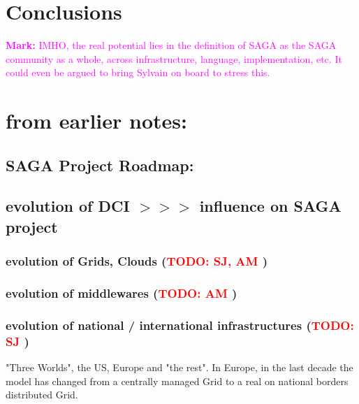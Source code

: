 \documentclass{article}
\newcommand{\B}[1]{\textbf{#1}}
\newcommand{\todo}[1]{{\textcolor{red}{\B{TODO:} #1 }}}
\newcommand{\msnote}[1]{{\textcolor{magenta}{ \B{Mark:    } #1 }}}
\newcommand{\msnote}[1]{}
\begin{document}
\section{Conclusions}

\msnote{IMHO, the real potential lies in the definition of SAGA as the
 SAGA community as a whole, across infrastructure, language, implementation, etc.
 It could even be argued to bring Sylvain on board to stress this.}



\label{sec:sum}






\newpage

\section{\B{from earlier notes:}}


 \subsection{ SAGA Project Roadmap:}


 \subsection{ evolution of DCI $>>>$ influence on SAGA project}
 \subsubsection{ evolution of Grids, Clouds (\todo{SJ, AM})}
 \subsubsection{ evolution of middlewares (\todo{AM})}
 \subsubsection{ evolution of national / international infrastructures (\todo{SJ})}

 "Three Worlds", the US, Europe and "the rest".  In Europe, in the
 last decade the model has changed from a centrally managed Grid to a
 real on national borders distributed Grid.\\
\end{document}
